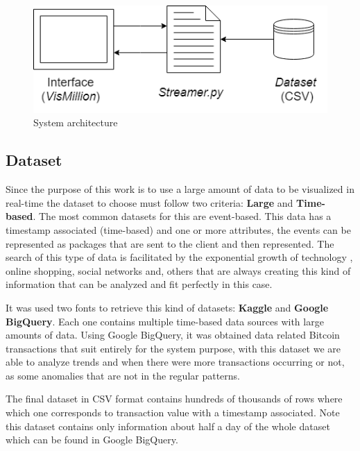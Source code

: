 \documentclass[letterpaper, 10 pt, conference]{ieeeconf}  %
\begin{document}
\begin{figure}[h]
    \centering
    \includegraphics[width=0.9\linewidth]{Figures/server_Structure.png}
    \caption{System architecture}
        \label{fig:server_struct}
\end{figure}

\subsection{Dataset}
\label{subsection:dataset}
Since the purpose of this work is to use a large amount of data to be visualized in real-time the dataset to choose must follow two criteria: \textbf{Large} and \textbf{Time-based}. The most common datasets for this are event-based. This data has a timestamp associated (time-based) and one or more attributes, the events can be represented as packages that are sent to the client and then represented. The search of this type of data is facilitated by the exponential growth of technology \cite{6567202}, online shopping, social networks and, others that are always creating this kind of information that can be analyzed and fit perfectly in this case.

It was used two fonts to retrieve this kind of datasets: \textbf{Kaggle} and \textbf{Google BigQuery}. Each one contains multiple time-based data sources with large amounts of data. Using Google BigQuery, it was obtained data related Bitcoin transactions that suit entirely for the system purpose, with this dataset we are able to analyze trends and when there were more transactions occurring or not, as some anomalies that are not in the regular patterns.

The final dataset in CSV format contains hundreds of thousands of rows where which one corresponds to transaction value with a timestamp associated. Note this dataset contains only information about half a day of the whole dataset which can be found in Google BigQuery.
\end{document}
